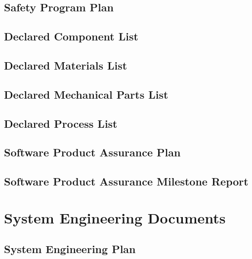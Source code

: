 \subsection{Safety Program Plan}
\label{sec:Safety Program Plan}


\subsection{Declared Component List}
\label{sec:Declared Component List}


\subsection{Declared Materials List}
\label{sec:Declared Materials List}


\subsection{Declared Mechanical Parts List}
\label{sec:Declared Mechanical Parts List}


\subsection{Declared Process List}
\label{sec:Declared Process List}


\subsection{Software Product Assurance Plan}
\label{sec:Software Product Assurance Plan}


\subsection{Software Product Assurance Milestone Report}
\label{sec:Software Product Assurance Milestone Report}

\section{System Engineering Documents}


\subsection{System Engineering Plan}
\label{sec:System Engineering Plan}


